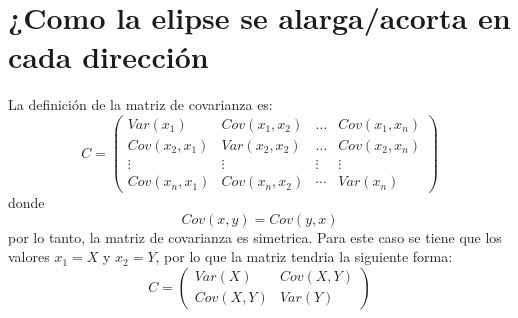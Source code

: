 \section{¿Como la elipse se alarga/acorta en cada dirección}
La definición de la matriz de covarianza es:
\begin{equation*}
    C= \begin{pmatrix}
        Var(x_1)     & Cov(x_1,x_2) & \dots  & Cov(x_1,x_n) \\
        Cov(x_2,x_1) & Var(x_2,x_2) & \dots  & Cov(x_2,x_n) \\
        \vdots       & \vdots       & \vdots & \vdots       \\
        Cov(x_n,x_1) & Cov(x_n,x_2) & \cdots & Var(x_n)
    \end{pmatrix}
\end{equation*}
donde
\begin{equation*}
    Cov(x,y)= Cov(y,x)
\end{equation*}
por lo tanto, la matriz de covarianza es simetrica. Para este caso se tiene que los valores $x_1=X$ y $x_2=Y$, por lo que la matriz tendria la siguiente forma:
\begin{equation*}
    C=\begin{pmatrix}
        Var(X)   & Cov(X,Y) \\
        Cov(X,Y) & Var(Y)
    \end{pmatrix}
\end{equation*}
